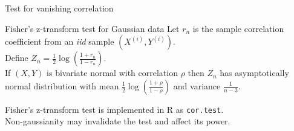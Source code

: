 \documentclass[11pt,handout,aspectratio=169,dvipsnames]{beamer}
\begin{document}
\begin{frame}[fragile]{Test for vanishing correlation}
\begin{alertblock}{Fisher's z-transform test for Gaussian data}
Let $r_n$ is the sample correlation coefficient from an \emph{iid} sample $(X^{(i)},Y^{(i)})$.\\[.2cm] Define $Z_n=\tfrac{1}{2}\log\left(\tfrac{1+r_n}{1-r_n}\right)$.\\[.2cm] 
If $(X,Y)$ is bivariate normal with correlation $\rho$ then $Z_n$ has \alert{asymptotically} normal distribution with mean $\tfrac{1}{2}\log\left(\tfrac{1+\rho}{1-\rho}\right)$ and variance $\tfrac{1}{n-3}$.\\[.2cm]
 \end{alertblock}
 Fisher's z-transform test is implemented in \textsc{R} as \texttt{cor.test}.\\[4mm]
Non-gaussianity may invalidate the test and affect its power.	
\end{frame}


\end{document}

